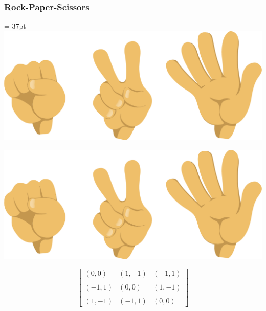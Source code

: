\begin{frame}
    \frametitle{Rock-Paper-Scissors}

    \hfuzz = 37pt
    \hspace{3.9cm}
    \vspace{-1cm}
    \includegraphics[width=.39\textwidth]{Bin/rock-paper-scissors.png}

    \begin{multicols}{3}
        \begin{flushright}
            \includegraphics[width=.25\textwidth, angle=270]{Bin/rock-paper-scissors.png}
        \end{flushright}
            
        \columnbreak
 
        \begin{equation*}
            \begin{bmatrix}
                (0,0) & (1,-1) & (-1,1) \\
                & & \\
                (-1,1) & (0,0) & (1,-1) \\
                & & \\
                (1,-1) & (-1,1) & (0,0)
            \end{bmatrix}
        \end{equation*}

        \columnbreak
        \vfill
    \end{multicols}

\end{frame}
